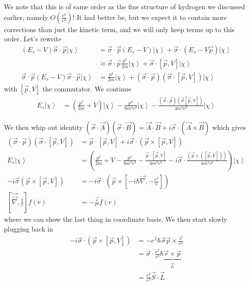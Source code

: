 \documentclass[10pt]{report}
\newcommand{\ket}[1]{\left|#1\right>}
\newcommand{\grad}[0]{\vec{\nabla}}
\begin{document}
We note that this is of same order as the fine structure of hydrogen we discussed earlier, namely $O\left( \frac{v^2}{c^2} \right)$! It had better be, but we expect it to contain more corrections than just the kinetic term, and we will only keep terms up to this order. Let's rewrite
\begin{align}
    \left( E_s - V \right)\vec{\sigma}\cdot \vec{p}\ket{\chi} &= \vec{\sigma}\cdot \vec{p}\left( E_s - V \right)\ket{\chi} + \vec{\sigma}\cdot\left( E_s - V\vec{p} \right)\ket{\chi}\\
    &\approx \vec{\sigma}\cdot \vec{p}\frac{p^2}{2m}\ket{\chi} + \vec{\sigma}\cdot\left[ \vec{p}, V \right]\ket{\chi}\\
    \vec{\sigma}\cdot \vec{p}\left( E_s-V \right)\vec{\sigma}\cdot \vec{p}\ket{\chi} &= \frac{p^4}{2m}\ket{\chi} + \left( \vec{\sigma}\cdot \vec{p} \right)\left( \vec{\sigma}\cdot \left[ \vec{p},V \right] \right)\ket{\chi}
\end{align}
with $\left[ \vec{p},V \right]$ the commutator. We continue
\begin{align}
    E_s\ket{\chi} &= \left( \frac{p^2}{2m} + V \right)\ket{\chi} - \frac{p^4}{8m^3c^2}\ket{\chi} - \frac{\left(\vec{\sigma}\cdot \vec{p}\right)\left( \vec{\sigma}\left[ \vec{p},V \right] \right)}{4m^2c^2}\ket{\chi}
\end{align}

We then whip out identity $\left( \vec{\sigma}\cdot \vec{A} \right)\left( \vec{\sigma}\cdot \vec{B} \right) = \vec{A}\cdot \vec{B} + i\vec{\sigma}\cdot \left( \vec{A}\times\vec{B} \right)$ which gives
\begin{align}
    \left( \vec{\sigma}\cdot \vec{p} \right)\left( \vec{\sigma}\cdot \left[ \vec{p},V \right] \right) &= \vec{p}\cdot \left[ \vec{p},V \right] + i\vec{\sigma}\cdot\left( \vec{p}\times\left[ \vec{p},V \right] \right)\\
    E_s\ket{\chi} &= \left( \frac{p^2}{2m} + V - \frac{p^4}{8m^3c^2} - \frac{\vec{p}\cdot \left[ \vec{p},V \right]}{4m^2c^2} - i\vec{\sigma}\cdot \frac{\left( \vec{p}\times\left( \left[ \vec{p}, V \right] \right) \right)}{4m^2c^2} \right)\ket{\chi}\\
    -i\vec{\sigma}\left( \vec{p}\times\left[ \vec{p},V \right] \right) &= -i\vec{\sigma}\cdot\left( \vec{p}\times \left[ -i\hbar\grad ,-\frac{e^2}{r} \right] \right)\\
    \left[ \vec{\grad }, \frac{1}{r} \right]f(r) &= -\frac{\vec{r}}{r^3}f(r)
\end{align}
where we can show the last thing in coordinate basis. We then start slowly plugging back in
\begin{align}
    -i\vec{\sigma}\cdot \left( \vec{p}\times\left[ \vec{p},V \right] \right) &= -e^2\hbar \vec{\sigma}\vec{p}\times\frac{\vec{r}}{r^3}\\
    &= \vec{\sigma}\cdot\frac{e^2}{r^3}\hbar\underbrace{ \vec{r}\times\vec{p}}_{\vec{L}}\\
    &= \frac{e^2}{r^3}\vec{S}\cdot \vec{L}
\end{align}
\end{document}
